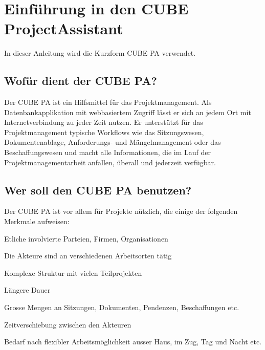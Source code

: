 
\section{Einführung in den CUBE ProjectAssistant} %

In dieser Anleitung wird die Kurzform CUBE PA verwendet.

\subsection{Wofür dient der CUBE PA?} %

Der CUBE PA ist ein Hilfsmittel für das Projektmanagement. Als Datenbankapplikation mit webbasiertem Zugriff lässt er sich an jedem Ort mit Internetverbindung zu jeder Zeit nutzen. Er unterstützt für das Projektmanagement typische Workflows wie das Sitzungswesen, Dokumentenablage, Anforderungs- und Mängelmanagement oder das Beschaffungswesen und macht alle Informationen, die im Lauf der Projektmanagementarbeit anfallen, überall und jederzeit verfügbar.

\subsection{Wer soll den CUBE PA benutzen?} %

Der CUBE PA ist vor allem für Projekte nützlich, die einige der folgenden Merkmale aufweisen:

	
\begin{compactitem}
	\item Etliche involvierte Parteien, Firmen, Organisationen
	\item Die Akteure sind an verschiedenen Arbeitsorten tätig
	\item Komplexe Struktur mit vielen Teilprojekten
	\item Längere Dauer
	\item Grosse Mengen an Sitzungen, Dokumenten, Pendenzen, Beschaffungen etc.
	\item Zeitverschiebung zwischen den Akteuren
	\item Bedarf nach flexibler Arbeitsmöglichkeit ausser Haus, im Zug, Tag und Nacht etc.
\end{compactitem}	
		
